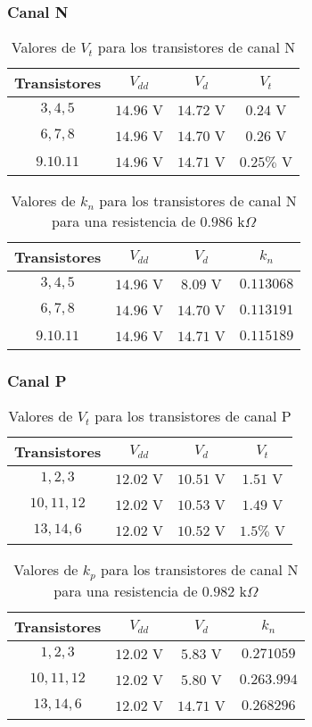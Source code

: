 \documentclass[11pt,graphicx,caption,rotating]{article}
\begin{document}
\subsubsection{Canal N}
\begin{table}[H]
	\centering
\begin{tabular}[c]{|c|c|c|c|} \hline
Transistores & $V_{dd}$ & $V_d$ & $V_t$ \\ \hline
$3,4,5$ & $14.96$ V & $14.72$ V & $0.24$ V \\ \hline
$6,7,8$ & $14.96$ V & $14.70$ V & $0.26$ V \\ \hline
$9.10.11$ & $14.96$ V & $14.71$ V & $0.25\%$ V \\ \hline
\end{tabular}
	\caption{Valores de $V_t$ para los transistores de canal N}
	\label{tab8}
\end{table}
\begin{table}[H]
	\centering
\begin{tabular}[c]{|c|c|c|c|} \hline
Transistores & $V_{dd}$ & $V_d$ & $k_n$ \\ \hline
$3,4,5$ & $14.96$ V & $8.09$ V & $0.113068$ \\ \hline
$6,7,8$ & $14.96$ V & $14.70$ V & $0.113191$ \\ \hline
$9.10.11$ & $14.96$ V & $14.71$ V & $0.115189$ \\ \hline
\end{tabular}
	\caption{Valores de $k_n$ para los transistores de canal N para una resistencia de $0.986$ k$\Omega$}
	\label{tab9}
\end{table}

\subsubsection{Canal P}
\begin{table}[H]
	\centering
\begin{tabular}[c]{|c|c|c|c|} \hline
Transistores & $V_{dd}$ & $V_d$ & $V_t$ \\ \hline
$1,2,3$ & $12.02$ V & $10.51$ V & $1.51$ V \\ \hline
$10,11,12$ & $12.02$ V & $10.53$ V & $1.49$ V \\ \hline
$13,14,6$ & $12.02$ V & $10.52$ V & $1.5\%$ V \\ \hline
\end{tabular}
	\caption{Valores de $V_t$ para los transistores de canal P}
	\label{tab10}
\end{table}
\begin{table}[H]
	\centering
\begin{tabular}[c]{|c|c|c|c|} \hline
Transistores & $V_{dd}$ & $V_d$ & $k_n$ \\ \hline
$1,2,3$ & $12.02$ V & $5.83$ V & $0.271059$ \\ \hline
$10,11,12$ & $12.02$ V & $5.80$ V & $0.263.994$ \\ \hline
$13,14,6$ & $12.02$ V & $14.71$ V & $0.268296$ \\ \hline
\end{tabular}
	\caption{Valores de $k_p$ para los transistores de canal N para una resistencia de $0.982$ k$\Omega$}
	\label{tab11}
\end{table}
\end{document}
